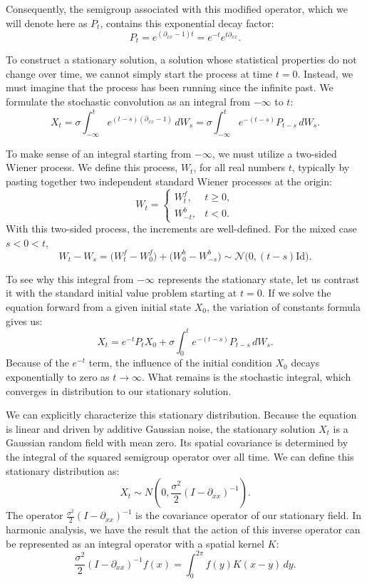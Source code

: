 \documentclass[11pt]{article}
\theoremstyle{definition}
\theoremstyle{remark}
\begin{document}
Consequently, the semigroup associated with this modified operator, which we will denote here as $P_t$, contains this exponential decay factor:
\[
P_t=e^{(\partial_{xx}-1)t}=e^{-t}e^{t\partial_{xx}}.
\]

To construct a stationary solution, a solution whose statistical properties do not change over time, we cannot simply start the process at time $t=0$. Instead, we must imagine that the process has been running since the infinite past. We formulate the stochastic convolution as an integral from $-\infty$ to $t$:
\[
X_t
=
\sigma\int_{-\infty}^t e^{(t-s)(\partial_{xx}-1)}\,dW_s
=
\sigma\int_{-\infty}^t e^{-(t-s)}P_{t-s}\,dW_s.
\]

To make sense of an integral starting from $-\infty$, we must utilize a two-sided Wiener process. We define this process, $W_t$, for all real numbers $t$, typically by pasting together two independent standard Wiener processes at the origin:
\[
W_t=
\begin{cases}
W_t^f, & t\ge0,\\
W_{-t}^b, & t<0.
\end{cases}
\]
With this two-sided process, the increments are well-defined. For the mixed case $s<0<t$,
\[
W_t-W_s
=
\bigl(W_t^f-W_0^f\bigr)+\bigl(W_0^b-W_{-s}^b\bigr)
\sim
\mathcal N\!\bigl(0,(t-s)\mathrm{Id}\bigr).
\]

To see why this integral from $-\infty$ represents the stationary state, let us contrast it with the standard initial value problem starting at $t=0$. If we solve the equation forward from a given initial state $X_0$, the variation of constants formula gives us:
\[
X_t
=
e^{-t}P_tX_0
+\sigma\int_0^t e^{-(t-s)}P_{t-s}\,dW_s.
\]
Because of the $e^{-t}$ term, the influence of the initial condition $X_0$ decays exponentially to zero as $t\to\infty$. What remains is the stochastic integral, which converges in distribution to our stationary solution.

We can explicitly characterize this stationary distribution. Because the equation is linear and driven by additive Gaussian noise, the stationary solution $X_t$ is a Gaussian random field with mean zero. Its spatial covariance is determined by the integral of the squared semigroup operator over all time. We can define this stationary distribution as:
\[
X_t\sim N\!\left(0,\frac{\sigma^2}{2}(I-\partial_{xx})^{-1}\right).
\]
The operator $\frac{\sigma^2}{2}(I-\partial_{xx})^{-1}$ is the covariance operator of our stationary field. In harmonic analysis, we have the result that the action of this inverse operator can be represented as an integral operator with a spatial kernel $K$:
\[
\frac{\sigma^2}{2}(I-\partial_{xx})^{-1}f(x)
=
\int_0^{2\pi} f(y)K(x-y)\,dy.
\]
\end{document}

